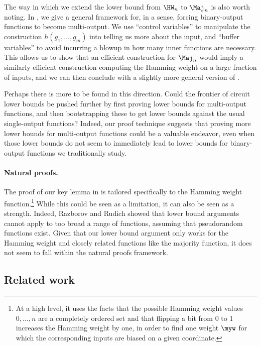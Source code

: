 The way in which we extend the lower bound from $\HW_n$ to $\Maj_n$ is also worth noting.
In , we give a general framework for, in a sense, forcing binary-output functions to become multi-output.
We use ``control variables'' to manipulate the construction $h(g_1, \ldots, g_m)$ into telling us more about the input, and ``buffer variables'' to avoid incurring a blowup in how many inner functions are necessary.
This allows us to show that an efficient construction for $\Maj_n$ would imply a similarly efficient construction computing the Hamming weight on a large fraction of inputs, and we can then conclude with a slightly more general version of .

Perhaps there is more to be found in this direction.
Could the frontier of circuit lower bounds be pushed further by first proving lower bounds for multi-output functions, and then bootstrapping these to get lower bounds against the usual single-output functions?
Indeed, our proof technique suggests that proving more lower bounds for multi-output functions could be a valuable endeavor, even when those lower bounds do not seem to immediately lead to lower bounds for binary-output functions we traditionally study.





\paragraph*{Natural proofs.}
The proof of our key lemma in  is tailored specifically to the Hamming weight function.\footnote{At a high level, it uses the facts that the possible Hamming weight values $0, \ldots, n$ are a completely ordered set
and that flipping a bit from $0$ to $1$ increases the Hamming weight by one,
in order to find one weight $\myw$ for which the corresponding inputs are biased on a given coordinate.}
While this could be seen as a limitation, it can also be seen as a strength.
Indeed, Razborov and Rudich \cite{RR97} showed that lower bound arguments
cannot apply to too broad a range of functions, assuming that pseudorandom functions exist.
Given that our lower bound argument only works for the Hamming weight and closely related functions like the majority function, it does not seem to fall within the natural proofs framework.








\subsection{Related work}\label{sec:related}

